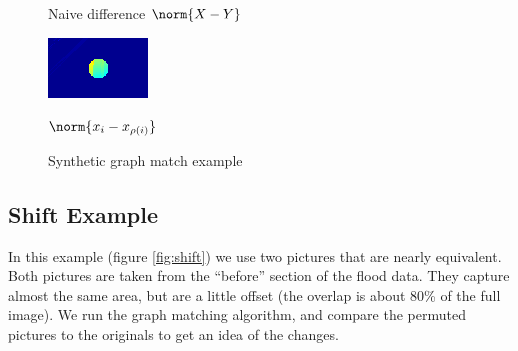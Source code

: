 \documentclass[12pt]{article}
\begin{document}
\begin{figure}
\begin{minipage}[b]{0.40\linewidth}
    \caption{Naive difference $\norm{X-Y}$}
  \end{minipage}
  \hfill
  \begin{minipage}[b]{0.40\linewidth}
    \centering
    \includegraphics[width=\textwidth]{./normMap.png}
    \caption{$\norm{x_i - x_{\rho(i)}}$}
  \end{minipage}
  \caption{Synthetic graph match example}
  \label{fig:synthetic}
\end{figure}

\subsection{Shift Example}

In this example (figure \ref{fig:shift}) we use two pictures that are nearly equivalent. Both pictures are taken from the ``before'' section of the flood data. They capture almost the same area, but are a little offset (the overlap is about 80\% of the full image). We run the graph matching algorithm, and compare the permuted pictures to the originals to get an idea of the changes.
\end{document}
